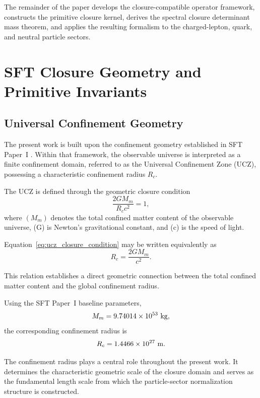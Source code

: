 \documentclass[11pt]{article}
\theoremstyle{definition}
\theoremstyle{remark}
\begin{document}
The remainder of the paper develops the closure-compatible
operator framework, constructs the primitive closure kernel,
derives the spectral closure determinant mass theorem, and
applies the resulting formalism to the charged-lepton, quark,
and neutral particle sectors.


\section{SFT Closure Geometry and Primitive Invariants}

\subsection{Universal Confinement Geometry}
\label{subsec:universal_confinement_geometry}

The present work is built upon the confinement geometry established
in SFT Paper~I \cite{Egbon2025I}. Within that framework, the
observable universe is interpreted as a finite confinement domain,
referred to as the Universal Confinement Zone (UCZ), possessing a
characteristic confinement radius \(R_c\).

The UCZ is defined through the geometric closure condition
\begin{equation}
\frac{2GM_m}{R_c c^2} = 1,
\label{eq:ucz_closure_condition}
\end{equation}
where $(M_m)$ denotes the total confined matter content of the
observable universe, (G) is Newton's gravitational constant,
and (c) is the speed of light.

Equation~\eqref{eq:ucz_closure_condition} may be written
equivalently as
\begin{equation}
R_c = \frac{2GM_m}{c^2}.
\label{eq:ucz_radius}
\end{equation}

This relation establishes a direct geometric connection between
the total confined matter content and the global confinement
radius.

Using the SFT Paper~I baseline parameters,
\begin{equation}
M_m = 9.74014\times10^{53}\ {\rm kg},
\end{equation}
the corresponding confinement radius is
\begin{equation}
R_c = 1.4466\times10^{27}\ {\rm m}.
\end{equation}

The confinement radius plays a central role throughout the
present work. It determines the characteristic geometric scale
of the closure domain and serves as the fundamental length scale
from which the particle-sector normalization structure is
constructed.
\end{document}
